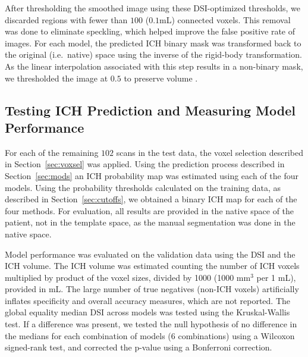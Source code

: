 \documentclass{elsarticle_nonatbib}\usepackage[]{graphicx}\usepackage[]{color}
\begin{document}
After thresholding the smoothed image using these DSI-optimized thresholds, we discarded regions with fewer than $100$ ($0.1$mL) connected voxels.  This removal was done to eliminate speckling, which helped improve the false positive rate of images.  For each model, the predicted ICH binary mask was transformed back to the original (i.e.~native) space using the inverse of the rigid-body transformation.  As the linear interpolation associated with this step results in a non-binary mask, we thresholded the image at $0.5$ to preserve volume \cite{flirt_reg}.



\subsection{Testing ICH Prediction and Measuring Model Performance}





For each of the remaining $102$ scans in the test data, the voxel selection described in Section~\ref{sec:voxsel} was applied. Using the prediction process described in Section~\ref{sec:mods} an ICH probability map was estimated using each of the four models.  Using the probability thresholds calculated on the training data, as described in Section~\ref{sec:cutoffs}, we obtained a binary ICH map for each of the four methods. For evaluation, all results are provided in
the native space of the patient, not in the template space, as the manual segmentation was done in the native space.

Model performance was evaluated on the validation data using the DSI and the ICH volume.  The ICH volume was estimated counting the number of ICH voxels multiplied by product of the voxel sizes, divided by 1000 (1000 mm$^3$ per 1 mL), provided in mL.  The large number of true negatives (non-ICH voxels) artificially inflates specificity and overall accuracy measures, which are not reported.  The global equality median DSI across models was tested using the Kruskal-Wallis test.  If a difference was present, we tested the null hypothesis of no difference in the medians for each combination of models ($6$ combinations) using a Wilcoxon signed-rank test, and corrected the p-value using a Bonferroni correction.  
\end{document}
